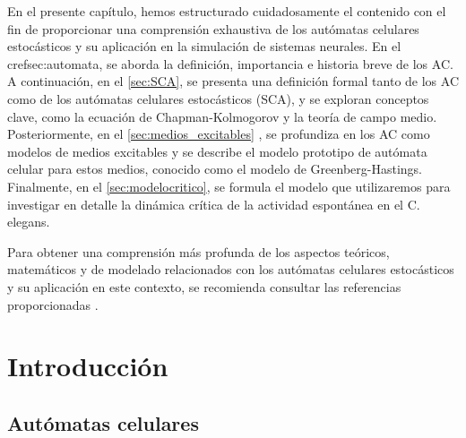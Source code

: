 En el presente capítulo, hemos estructurado cuidadosamente el contenido con el fin de proporcionar una comprensión exhaustiva de los autómatas celulares estocásticos y su aplicación en la simulación de sistemas neurales. En el cref{sec:automata}, se aborda la definición, importancia e historia breve de los AC. A continuación, en el \cref{sec:SCA}, se presenta una definición formal tanto de los AC como de los autómatas celulares estocásticos (SCA), y se exploran conceptos clave, como la ecuación de Chapman-Kolmogorov y la teoría de campo medio. Posteriormente, en el \cref{sec:medios_excitables} , se profundiza en los AC como modelos de medios excitables y se describe el modelo prototipo de autómata celular para estos medios, conocido como el modelo de Greenberg-Hastings. Finalmente, en  el  \cref{sec:modelocritico}, se formula el modelo que utilizaremos para investigar en detalle la dinámica crítica de la actividad espontánea en el C. elegans.

Para obtener una comprensión más profunda de los aspectos teóricos, matemáticos y de modelado relacionados con los autómatas celulares estocásticos y su aplicación en este contexto, se recomienda consultar las referencias proporcionadas \cite{louis_probabilistic_2018,ilachinski_cellular_2001,vichniac_simulating_1984,deutsch_cellular_2017,hadeler_cellular_2017}. 



\section{Introducción}


\subsection{Autómatas celulares}\label{sec:automata}



